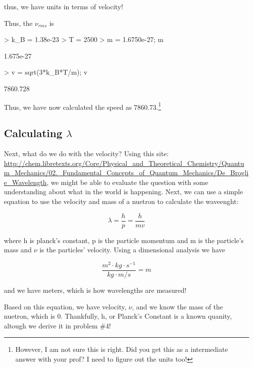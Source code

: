 \documentclass{article}
\begin{document}
\noindent thus, we have units in terms of velocity! 

Thus, the $\nu_{rms}$ is
\begin{Schunk}
\begin{Sinput}
> k_B = 1.38e-23
> T = 2500
> m = 1.6750e-27; m
\end{Sinput}
\begin{Soutput}
[1] 1.675e-27
\end{Soutput}
\begin{Sinput}
> v = sqrt(3*k_B*T/m); v
\end{Sinput}
\begin{Soutput}
[1] 7860.728
\end{Soutput}
\end{Schunk}

Thus, we have now calculated the speed as 7860.73.\footnote{However, I am not sure this is right. Did you get this as a intermediate answer with your prof? I need to figure out the units too!}

\subsection{Calculating $\lambda$}

Next, what do we do with the velocity? Using this site: \url{http://chem.libretexts.org/Core/Physical_and_Theoretical_Chemistry/Quantum_Mechanics/02._Fundamental_Concepts_of_Quantum_Mechanics/De_Broglie_Wavelength}, we might be able to evaluate the question with some understanding about what in the world is happening. Next, we can use a simple equation to use the velocity and mass of a nuetron to calculate the waveenght:

\begin{equation}
\lambda = \frac{h}{p} = \frac{h}{ m v}
\end{equation}

\noindent where h is planck's constant, p is the particle momentum and m is the particle's mass and $\nu$ is the particles' velocity. Using a dimensional analysis we have

\begin{equation}
\frac{m^2 \cdot kg \cdot s^{-1}}{kg \cdot m /s} = m  
\end{equation}

\noindent and we have meters, which is how wavelengths are measured!

Based on this equation, we have velocity, $\nu$, and we know the mass of the nuetron, which is 0. Thankfully, h, or Planck's Constant is a known quanity, altough we derive it in problem \#4!
\end{document}
